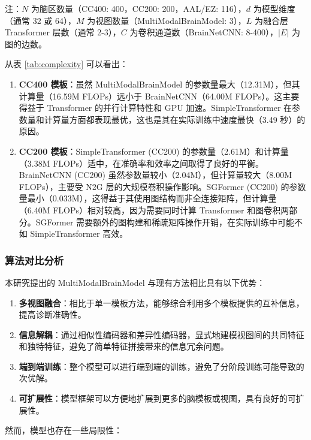 \documentclass[12pt,a4paper]{article}
\begin{document}
注：$N$ 为脑区数量（CC400: 400，CC200: 200，AAL/EZ: 116），$d$ 为模型维度（通常 32 或 64），$M$ 为视图数量（MultiModalBrainModel: 3），$L$ 为融合层 Transformer 层数（通常 2-3），$C$ 为卷积通道数（BrainNetCNN: 8-400），$|E|$ 为图的边数。

从表 \ref{tab:complexity} 可以看出：

\begin{enumerate}
\item \textbf{CC400 模板}：虽然 MultiModalBrainModel 的参数量最大（12.31M），但其计算量（16.59M FLOPs）远小于 BrainNetCNN（64.00M FLOPs）。这主要得益于 Transformer 的并行计算特性和 GPU 加速。SimpleTransformer 在参数量和计算量方面都表现最优，这也是其在实际训练中速度最快（3.49 秒）的原因。

\item \textbf{CC200 模板}：SimpleTransformer (CC200) 的参数量（2.61M）和计算量（3.38M FLOPs）适中，在准确率和效率之间取得了良好的平衡。BrainNetCNN (CC200) 虽然参数量较小（2.04M），但计算量较大（8.00M FLOPs），主要受 N2G 层的大规模卷积操作影响。SGFormer (CC200) 的参数量最小（0.033M），这得益于其使用图结构而非全连接矩阵，但计算量（6.40M FLOPs）相对较高，因为需要同时计算 Transformer 和图卷积两部分。SGFormer 需要额外的图构建和稀疏矩阵操作开销，在实际训练中可能不如 SimpleTransformer 高效。
\end{enumerate}

\subsubsection{算法对比分析}

本研究提出的 MultiModalBrainModel 与现有方法相比具有以下优势：

\begin{enumerate}
\item \textbf{多视图融合}：相比于单一模板方法，能够综合利用多个模板提供的互补信息，提高诊断准确性。

\item \textbf{信息解耦}：通过相似性编码器和差异性编码器，显式地建模视图间的共同特征和独特特征，避免了简单特征拼接带来的信息冗余问题。

\item \textbf{端到端训练}：整个模型可以进行端到端的训练，避免了分阶段训练可能导致的次优解。

\item \textbf{可扩展性}：模型框架可以方便地扩展到更多的脑模板或视图，具有良好的可扩展性。
\end{enumerate}

然而，模型也存在一些局限性：
\end{document}
